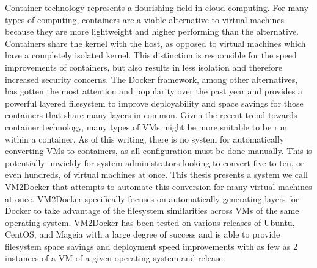 % 
% 
%
Container technology represents a flourishing field in cloud computing. For many types of computing, containers are a viable alternative to virtual machines because they are more lightweight and higher performing than the alternative. Containers share the kernel with the host, as opposed to virtual machines which have a completely isolated kernel. This distinction is responsible for the speed improvements of containers, but also results in less isolation and therefore increased security concerns. The Docker framework, among other alternatives, has gotten the most attention and popularity over the past year and provides a powerful layered filesystem to improve deployability and space savings for those containers that share many layers in common. Given the recent trend towards container technology, many types of VMs might be more suitable to be run within a container. As of this writing, there is no system for automatically converting VMs to containers, as all configuration must be done manually. This is potentially unwieldy for system administrators looking to convert five to ten, or even hundreds, of virtual machines at once.  This thesis presents a system we call VM2Docker that attempts to automate this conversion for many virtual machines at once. VM2Docker specifically focuses on automatically generating layers for Docker to take advantage of the filesystem similarities across VMs of the same operating system. VM2Docker has been tested on various releases of Ubuntu, CentOS, and Mageia with a large degree of success and is able to provide filesystem space savings and deployment speed improvements with as few as 2 instances of a VM of a given operating system and release.
